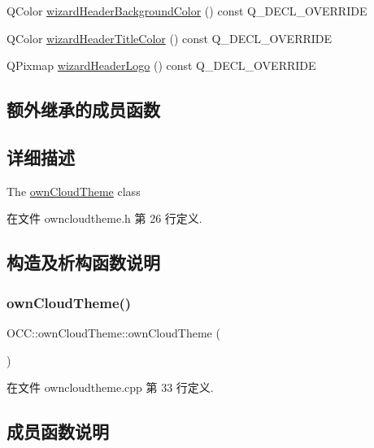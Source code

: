 \begin{DoxyCompactItemize}
\item 
Q\+Color \hyperlink{class_o_c_c_1_1own_cloud_theme_a704928959879d3343f1d68c665bd11fb}{wizard\+Header\+Background\+Color} () const Q\+\_\+\+D\+E\+C\+L\+\_\+\+O\+V\+E\+R\+R\+I\+DE
\item 
Q\+Color \hyperlink{class_o_c_c_1_1own_cloud_theme_a7eb765922b1798d364003d1c9328c65e}{wizard\+Header\+Title\+Color} () const Q\+\_\+\+D\+E\+C\+L\+\_\+\+O\+V\+E\+R\+R\+I\+DE
\item 
Q\+Pixmap \hyperlink{class_o_c_c_1_1own_cloud_theme_ac9b6d61d21d239bfa4bf156482e63f76}{wizard\+Header\+Logo} () const Q\+\_\+\+D\+E\+C\+L\+\_\+\+O\+V\+E\+R\+R\+I\+DE
\end{DoxyCompactItemize}
\subsection*{额外继承的成员函数}


\subsection{详细描述}
The \hyperlink{class_o_c_c_1_1own_cloud_theme}{own\+Cloud\+Theme} class 

在文件 owncloudtheme.\+h 第 26 行定义.



\subsection{构造及析构函数说明}
\mbox{\label{class_o_c_c_1_1own_cloud_theme_a6ebd5b6458ac1e481d5605b65c0099f0}} 
\subsubsection{\texorpdfstring{own\+Cloud\+Theme()}{ownCloudTheme()}}
{\footnotesize\ttfamily O\+C\+C\+::own\+Cloud\+Theme\+::own\+Cloud\+Theme (\begin{DoxyParamCaption}{ }\end{DoxyParamCaption})}



在文件 owncloudtheme.\+cpp 第 33 行定义.



\subsection{成员函数说明}
\mbox{\label{class_o_c_c_1_1own_cloud_theme_a421c900cd70e33ade914a2066cb9b55c}} 
